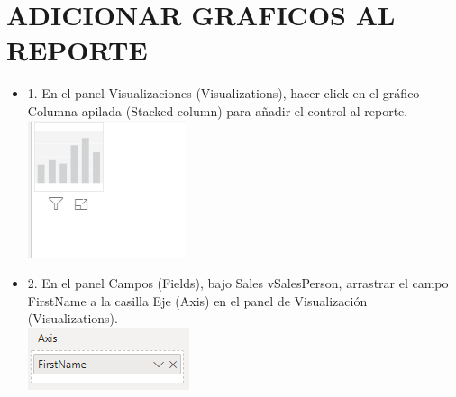 \section{ADICIONAR GRAFICOS AL REPORTE} 

\begin{itemize}

\item 1. En el panel Visualizaciones (Visualizations), hacer click en el gráfico Columna apilada (Stacked column) para
añadir el control al reporte. \\
\includegraphics[scale=0.5]{./Imagenes/image015}
\item 2. En el panel Campos (Fields), bajo Sales vSalesPerson, arrastrar el campo FirstName a la casilla Eje (Axis) en el
panel de Visualización (Visualizations). \\
\includegraphics[scale=0.8]{./Imagenes/image016}


\end{itemize}
